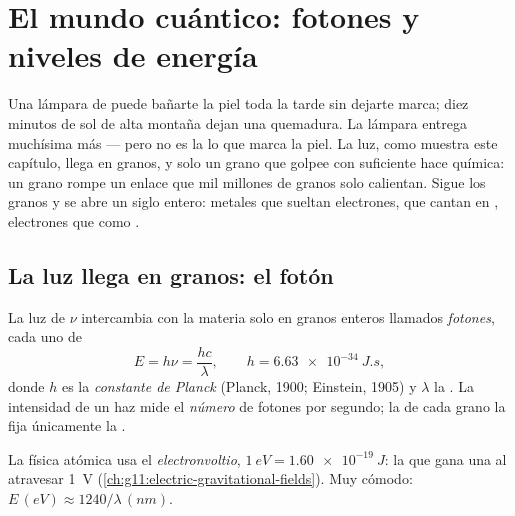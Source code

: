 \chapter{El mundo cuántico: fotones y niveles de energía}\label{ch:g12:quantum-world}

Una lámpara de  puede bañarte la piel toda la tarde sin dejarte marca; diez
minutos de sol de alta montaña dejan una quemadura. La lámpara entrega muchísima más
 --- pero no es la  lo que marca la piel. La luz, como muestra este
capítulo, llega en granos, y solo un grano que golpee con suficiente  hace
química: un grano  rompe un enlace que mil millones de granos 
solo calientan. Sigue los granos y se abre un siglo entero: metales que sueltan
electrones,  que cantan en , electrones que  como
.

\section{La luz llega en granos: el fotón}

\begin{definition}[El fotón]\label{def:g12:quantum-world:photon}
La luz de  $\nu$ intercambia  con la materia solo en granos enteros
llamados \emph{fotones}, cada uno de 
\[
E = h\nu = \frac{hc}{\lambda}, \qquad h = \qty{6.63e-34}{J.s},
\]
donde $h$ es la \emph{constante de Planck} (Planck, 1900;
Einstein, 1905) y $\lambda$ la . La intensidad de un haz
mide el \emph{número} de fotones por segundo; la  de cada grano la fija
únicamente la .
\end{definition}

\begin{notation}[El electronvoltio]\label{not:g12:quantum-world:ev}
La física atómica usa el \emph{electronvoltio},
$\qty{1}{eV} = \qty{1.60e-19}{J}$: la  que gana una  al
atravesar \qty{1}{V} (\cref{ch:g11:electric-gravitational-fields}). Muy cómodo:
$E \,(\unit{eV}) \approx 1240/\lambda\,(\unit{nm})$.
\end{notation}

